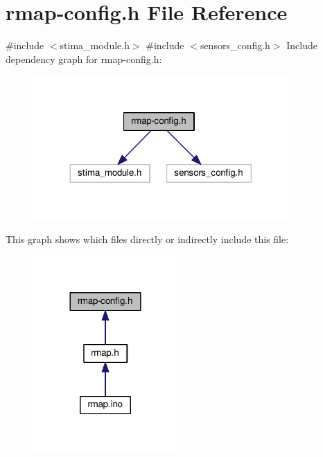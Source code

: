\hypertarget{rmap-config_8h}{}\section{rmap-\/config.h File Reference}
\label{rmap-config_8h}
{\ttfamily \#include $<$stima\+\_\+module.\+h$>$}\newline
{\ttfamily \#include $<$sensors\+\_\+config.\+h$>$}\newline
Include dependency graph for rmap-\/config.h\+:
\nopagebreak
\begin{figure}[H]
\begin{center}
\leavevmode
\includegraphics[width=276pt]{rmap-config_8h__incl}
\end{center}
\end{figure}
This graph shows which files directly or indirectly include this file\+:
\nopagebreak
\begin{figure}[H]
\begin{center}
\leavevmode
\includegraphics[width=156pt]{rmap-config_8h__dep__incl}
\end{center}
\end{figure}
